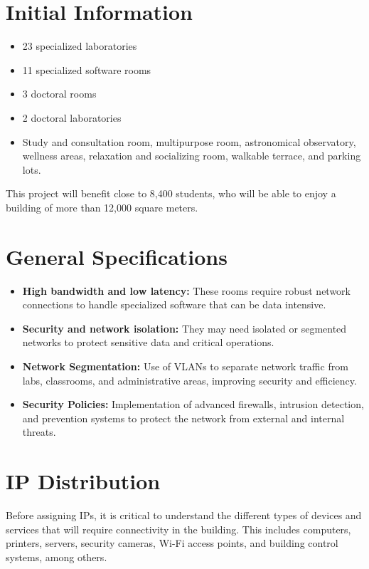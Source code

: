 \documentclass[12pt]{article}
\begin{document}
\section{Initial Information}

\begin{itemize}
    \item 23 specialized laboratories
    \item 11 specialized software rooms
    \item 3 doctoral rooms
    \item 2 doctoral laboratories
    \item Study and consultation room, multipurpose room, astronomical observatory, wellness areas, relaxation and socializing room, walkable terrace, and parking lots.
\end{itemize}

This project will benefit close to 8,400 students, who will be able to enjoy a building of more than 12,000 square meters. 

\section{General Specifications}

\begin{itemize}
    \item \textbf{High bandwidth and low latency:} These rooms require robust network connections to handle specialized software that can be data intensive.
    \item \textbf{Security and network isolation:} They may need isolated or segmented networks to protect sensitive data and critical operations.
    \item \textbf{Network Segmentation:} Use of VLANs to separate network traffic from labs, classrooms, and administrative areas, improving security and efficiency.
    \item \textbf{Security Policies:} Implementation of advanced firewalls, intrusion detection, and prevention systems to protect the network from external and internal threats.
\end{itemize}

\section{IP Distribution}

Before assigning IPs, it is critical to understand the different types of devices and services that will require connectivity in the building. This includes computers, printers, servers, security cameras, Wi-Fi access points, and building control systems, among others.
\end{document}
